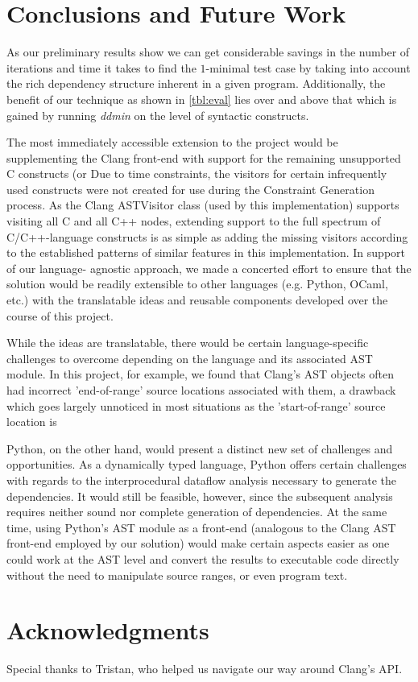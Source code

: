 \documentclass[preprint]{acm_proc_article-sp}
\begin{document}
\section{Conclusions and Future Work}
As our preliminary results show we can get considerable savings in the number of
iterations and time it takes to find the $1$-minimal test case by taking into
account the rich dependency structure inherent in a given program. Additionally,
the benefit of our technique as shown in \autoref{tbl:eval} lies over and above
that which is gained by running \emph{ddmin} on the level of syntactic
constructs.

The most immediately accessible extension to the project would be supplementing
the Clang front-end with support for the remaining unsupported C constructs (or
Due to time constraints, the visitors for certain infrequently used constructs
were not created for use during the Constraint Generation process. As the Clang
ASTVisitor class (used by this implementation) supports visiting all C and all
C++ nodes, extending support to the full spectrum of C/C++-language constructs
is as simple as adding the missing visitors according to the established
patterns of similar features in this implementation. In support of our language-
agnostic approach, we made a concerted effort to ensure that the solution would
be readily extensible to other languages (e.g. Python, OCaml, etc.) with the
translatable ideas and reusable components developed over the course of this
project.

While the ideas are translatable, there would be certain language-specific
challenges to overcome depending on the language and its associated AST module.
In this project, for example, we found that Clang's AST objects often had
incorrect 'end-of-range' source locations associated with them, a drawback which
goes largely unnoticed in most situations as the 'start-of-range' source
location is


Python, on the other hand, would present a distinct new set of challenges and
opportunities. As a dynamically typed language, Python offers certain challenges
with regards to the interprocedural dataflow analysis necessary to generate the
dependencies. It would still be feasible, however, since the subsequent analysis
requires neither sound nor complete generation of dependencies. At the same
time, using Python's AST module as a front-end (analogous to the Clang AST
front-end employed by our solution) would make certain aspects easier as one
could work at the AST level and convert the results to executable code directly
without the need to manipulate source ranges, or even program text.

\section{Acknowledgments}

Special thanks to Tristan, who helped us navigate our way around Clang's API.



\end{document}
